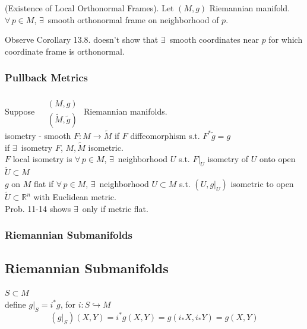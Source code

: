 \begin{corollary}[13.8] (Existence of Local Orthonormal Frames).  Let $(M,g)$ Riemannian manifold. \\
$\forall \, p \in M$, $\exists \, $ smooth orthonormal frame on neighborhood of $p$.
\end{corollary}



Observe Corollary 13.8.  doesn't show that $\exists \, $ smooth coordinates near $p$ for which coordinate frame is orthonormal. \\

\subsubsection*{Pullback Metrics}

Suppose $\begin{aligned} & \quad \\ 
  & (M,g) \\
  & (\widetilde{M}, \widetilde{g}) \end{aligned}$ \quad Riemannian manifolds.  \\

isometry - smooth $F: M \to \widetilde{M}$ if $F$ diffeomorphism s.t. $F^* \widetilde{g} = g$ \\
if $\exists \, $ isometry $F$, $M, \widetilde{M}$ isometric. \\
$F$ local isometry is $\forall \, p \in M$, $\exists \, $ neighborhood $U$ s.t. $\left. F \right|_U$ isometry of $U$ onto open $\widetilde{U} \subset M$ \\
$g$ on $M$ flat if $\forall \, p \in M$, $\exists \,$ neighborhood $U\subset M$ s.t. $(U , \left. g \right|_U)$ isometric to open $\widetilde{U} \subset \mathbb{R}^n$ with Euclidean metric.   \\





Prob. 11-14 shows $\exists \, $ only if metric flat.


\subsubsection*{Riemannian Submanifolds}

\subsection*{Riemannian Submanifolds}

$S\subset M$ \\
define $ \left. g \right|_S = i^* g$, for $i:S \hookrightarrow M$
\[
( \left. g \right|_S)(X,Y) = i^* g(X,Y) = g( i_* X,i_* Y) = g(X,Y)
\]

